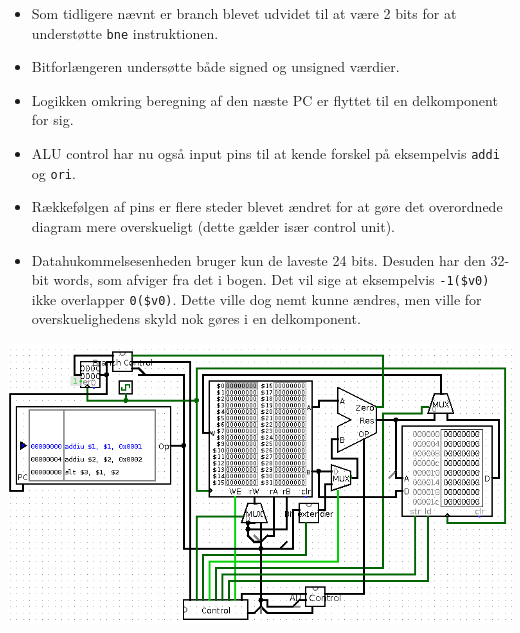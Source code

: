 \begin{itemize}
\item Som tidligere nævnt er branch blevet udvidet til at være 2 bits for at
understøtte {\tt bne} instruktionen.
\item Bitforlængeren undersøtte både signed og unsigned værdier.
\item Logikken omkring beregning af den næste PC er flyttet til en delkomponent
for sig.
\item ALU control har nu også input pins til at kende forskel på eksempelvis
{\tt addi} og {\tt ori}.
\item Rækkefølgen af pins er flere steder blevet ændret for at gøre det
overordnede diagram mere overskueligt (dette gælder især control unit).
\item Datahukommelsesenheden bruger kun de laveste 24 bits. Desuden har den
32-bit words, som afviger fra det i bogen. Det vil sige at eksempelvis
{\tt -1(\$v0)} ikke overlapper {\tt 0(\$v0)}. Dette ville dog nemt kunne ændres,
men ville for overskuelighedens skyld nok gøres i en delkomponent.
\end{itemize}
\includegraphics[angle=90,scale=0.9]{Billeder/single_cycle_main.png}
